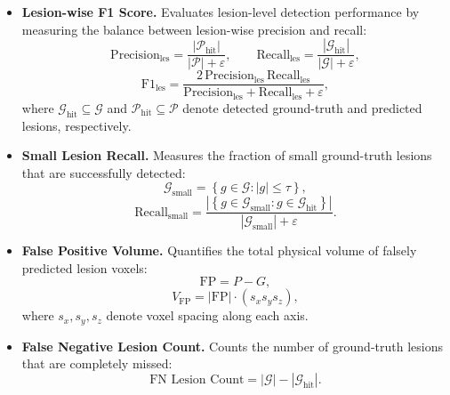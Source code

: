 \begin{itemize}
    \item \textbf{Lesion-wise F1 Score.} Evaluates lesion-level detection
    performance by measuring the balance between lesion-wise precision
    and recall:
    \begin{equation}
    \mathrm{Precision}_{\mathrm{les}} =
    \frac{|\mathcal{P}_{\mathrm{hit}}|}
    {|\mathcal{P}| + \varepsilon},
    \qquad
    \mathrm{Recall}_{\mathrm{les}} =
    \frac{|\mathcal{G}_{\mathrm{hit}}|}
    {|\mathcal{G}| + \varepsilon},
    \end{equation}
    \begin{equation}
    \mathrm{F1}_{\mathrm{les}} =
    \frac{
        2 \, \mathrm{Precision}_{\mathrm{les}} \, \mathrm{Recall}_{\mathrm{les}}
    }{
        \mathrm{Precision}_{\mathrm{les}} + \mathrm{Recall}_{\mathrm{les}} + \varepsilon
    },
    \end{equation}
    where $\mathcal{G}_{\mathrm{hit}} \subseteq \mathcal{G}$ and
    $\mathcal{P}_{\mathrm{hit}} \subseteq \mathcal{P}$ denote detected
    ground-truth and predicted lesions, respectively.

    \item \textbf{Small Lesion Recall.} Measures the fraction of small
    ground-truth lesions that are successfully detected:
    \begin{equation}
    \mathcal{G}_{\mathrm{small}} =
    \left\{
        g \in \mathcal{G} : |g| \leq \tau
    \right\},
    \end{equation}
    \begin{equation}
    \mathrm{Recall}_{\mathrm{small}} =
    \frac{
        \left|
        \left\{
        g \in \mathcal{G}_{\mathrm{small}} : g \in \mathcal{G}_{\mathrm{hit}}
        \right\}
        \right|
    }{
        |\mathcal{G}_{\mathrm{small}}| + \varepsilon
    }.
    \end{equation}

    \item \textbf{False Positive Volume.} Quantifies the total physical
    volume of falsely predicted lesion voxels:
    \begin{equation}
    \mathrm{FP} = P - G,
    \end{equation}
    \begin{equation}
    V_{\mathrm{FP}} =
    |\mathrm{FP}| \cdot (s_x s_y s_z),
    \end{equation}
    where $s_x, s_y, s_z$ denote voxel spacing along each axis.

    \item \textbf{False Negative Lesion Count.} Counts the number of
    ground-truth lesions that are completely missed:
    \begin{equation}
    \text{FN Lesion Count} =
    |\mathcal{G}| - |\mathcal{G}_{\mathrm{hit}}|.
    \end{equation}


\end{itemize}
